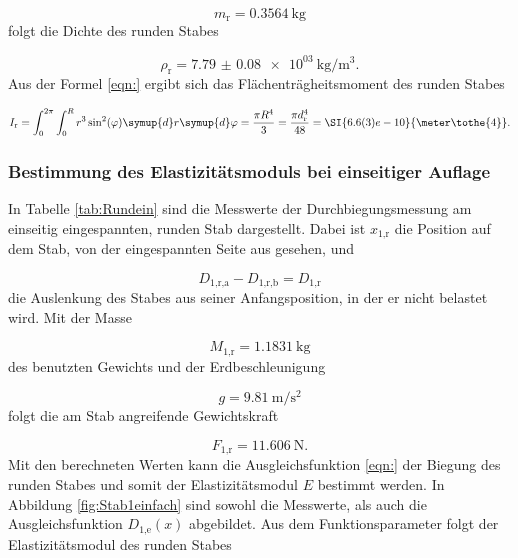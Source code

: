 \begin{equation}
  m_\text{r} = \SI{0.3564}{\kilo\gram}
\end{equation}
folgt die Dichte des runden Stabes

\begin{equation}
  \rho_\text{r} = \SI{7.79(8)e03}{\kilo\gram\per\cubic\meter}.
\end{equation}
Aus der Formel \eqref{eqn:} ergibt sich das Flächenträgheitsmoment des runden
Stabes

\begin{equation}
  I_\text{r} = \int_{0}^{2\pi}\int_{0}^{R} r^3 \sin^2(\varphi) \symup{d}r
  \symup{d}\varphi = \frac{\pi R^4}{3} = \frac{\pi d_\text{r}^4}{48} =
  \SI{6.6(3)e-10}{\meter\tothe{4}}.
\end{equation}

\subsubsection{Bestimmung des Elastizitätsmoduls bei einseitiger Auflage}

In Tabelle \ref{tab:Rundein} sind die Messwerte der Durchbiegungsmessung am
einseitig eingespannten, runden Stab dargestellt.
Dabei ist $x_\text{1,r}$ die Position auf dem Stab, von der eingespannten Seite
aus gesehen, und

\begin{equation}
  D_\text{1,r,a} - D_\text{1,r,b} = D_\text{1,r}
\end{equation}
die Auslenkung des Stabes aus seiner Anfangsposition, in der er nicht belastet
wird. Mit der Masse

\begin{equation}
  M_\text{1,r} = \SI{1.1831}{\kilo\gram}
\end{equation}
des benutzten Gewichts und der Erdbeschleunigung

\begin{equation}
  g = \SI{9.81}{\meter\per\second\squared}
  \label{eqn:Erdbeschl}
\end{equation}
folgt die am Stab angreifende Gewichtskraft

\begin{equation}
  F_\text{1,r} = \SI{11.606}{\newton}.
\end{equation}
Mit den berechneten Werten kann die Ausgleichsfunktion \eqref{eqn:} der Biegung
des runden Stabes und somit der Elastizitätsmodul $E$ bestimmt werden.
In Abbildung \ref{fig:Stab1einfach} sind sowohl die Messwerte, als auch die
Ausgleichsfunktion $D_\text{1,e}(x)$ abgebildet.
Aus dem Funktionsparameter folgt der Elastizitätsmodul des runden Stabes

